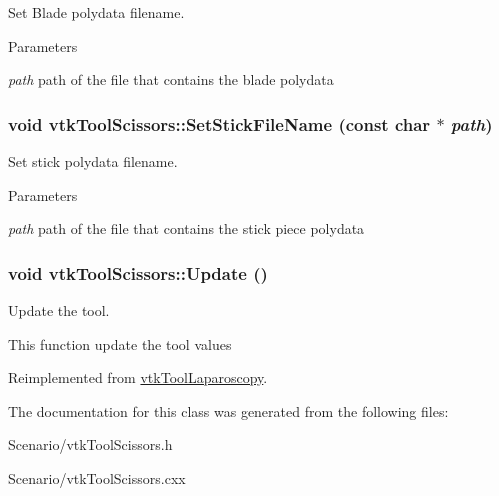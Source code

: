 Set Blade polydata filename. 


\begin{DoxyParams}{Parameters}
\item[{\em path}]path of the file that contains the blade polydata \end{DoxyParams}
\hypertarget{classvtkToolScissors_a22475f67e31779d51b49af9a875269f7}{
\subsubsection[{SetStickFileName}]{\setlength{\rightskip}{0pt plus 5cm}void vtkToolScissors::SetStickFileName (const char $\ast$ {\em path})}}
\label{classvtkToolScissors_a22475f67e31779d51b49af9a875269f7}


Set stick polydata filename. 


\begin{DoxyParams}{Parameters}
\item[{\em path}]path of the file that contains the stick piece polydata \end{DoxyParams}
\hypertarget{classvtkToolScissors_afe574b6b9e809f746308a157b6525c4b}{
\subsubsection[{Update}]{\setlength{\rightskip}{0pt plus 5cm}void vtkToolScissors::Update ()}}
\label{classvtkToolScissors_afe574b6b9e809f746308a157b6525c4b}


Update the tool. 

This function update the tool values 

Reimplemented from \hyperlink{classvtkToolLaparoscopy_a4445a0cfabd77b50a06929b04cb71f9e}{vtkToolLaparoscopy}.



The documentation for this class was generated from the following files:\begin{DoxyCompactItemize}
\item 
Scenario/vtkToolScissors.h\item 
Scenario/vtkToolScissors.cxx\end{DoxyCompactItemize}
